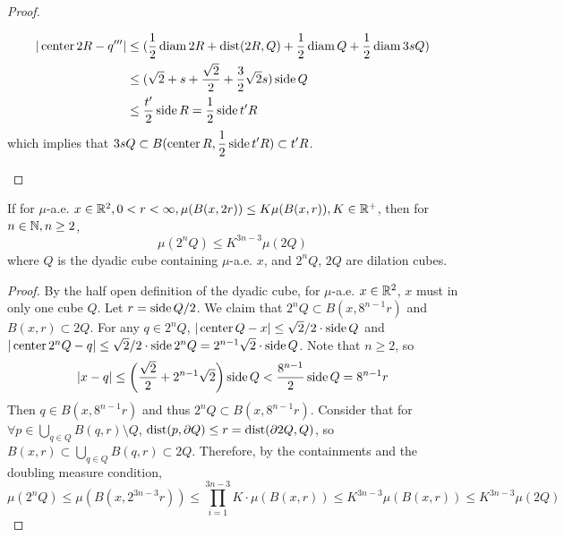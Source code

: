 \begin{proof}
\begin{enumerate}[(i)]
        \begin{equation*}
            \begin{split}
                |\operatorname{center} 2R - q^{\prime\prime\prime}| &\leq (\frac{1}{2}\operatorname{diam} 2R + \operatorname{dist}(2R, Q) + \frac{1}{2}\operatorname{diam} Q + \frac{1}{2}\operatorname{diam} 3sQ)\\
                &\leq (\sqrt{2}+s+\frac{\sqrt{2}}{2} + \frac{3}{2}\sqrt{2}s ) \operatorname{side} Q \\
                &\leq \frac{t^\prime}{2}\operatorname{side} R = \frac{1}{2}\operatorname{side} t^\prime R
            \end{split}
        \end{equation*}
        which implies that $\displaystyle 3sQ \subset B(\operatorname{center} R, \frac{1}{2}\operatorname{side} t^\prime R)\subset t^\prime R$.
    \end{enumerate}
\end{proof}


\begin{lemma}
    If for $\mu$-a.e. $x\in \mathbb{R}^2, 0<r<\infty, \mu(B(x, 2r))\leq K\mu(B(x,r)), K\in\mathbb{R}^+$, then for $n\in \mathbb{N}, n\geq 2$,
    \begin{equation}
        \mu(2^n Q)\leq K^{3n-3} \mu(2Q)
    \end{equation}
    where $Q$ is the dyadic cube containing $\mu$-a.e. $x$, and $2^n Q$, $2Q$ are dilation cubes.
\end{lemma}
\begin{proof}
    By the half open definition of the dyadic cube, for $\mu$-a.e. $x\in \mathbb{R}^2$, $x$ must in only one cube $Q$. Let $r = \operatorname{side} Q /2$. We claim that $2^n Q\subset B(x, 8^{n-1}r)$ and $B(x, r)\subset 2Q$. For any $q\in 2^n Q$, $|\operatorname{center} Q -x|\leq \sqrt{2}/2\cdot\operatorname{side} Q $ and $|\operatorname{center} 2^n Q -q|\leq \sqrt{2}/2 \cdot\operatorname{side} 2^n Q  = 2^{n-1}\sqrt{2}\cdot \operatorname{side} Q$. Note that $n\geq 2$, so
    \begin{equation*}
        |x-q| \leq \left(\frac{\sqrt{2}}{2} + 2^{n-1}\sqrt{2}\right) \operatorname{side} Q < \frac{8^{n-1}}{2} \operatorname{side} Q = 8^{n-1}r
    \end{equation*}
Then $q\in B(x, 8^{n-1}r)$ and thus $2^n Q\subset B(x, 8^{n-1}r)$. Consider that for $\forall p\in \bigcup_{q\in Q} B(q, r)\setminus Q$, $\operatorname{dist}(p, \partial Q)\leq r = \operatorname{dist}(\partial 2Q, Q)$, so $B(x, r)\subset \bigcup_{q\in Q} B(q, r)\subset 2Q$. Therefore, by the containments and the doubling measure condition, 
    \begin{equation*}
        \mu(2^n Q) \leq \mu(B(x, 2^{3n-3}r)) \leq \prod_{i=1}^{3n-3} K \cdot \mu(B(x,r))\leq K^{3n-3}\mu(B(x,r))\leq K^{3n-3}\mu(2Q)
    \end{equation*}
\end{proof}


